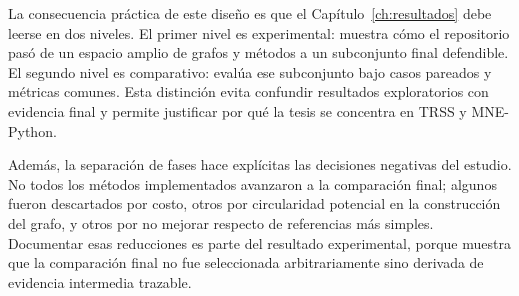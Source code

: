 La consecuencia práctica de este diseño es que el Capítulo~\ref{ch:resultados} debe leerse en dos niveles. El primer nivel es experimental: muestra cómo el repositorio pasó de un espacio amplio de grafos y métodos a un subconjunto final defendible. El segundo nivel es comparativo: evalúa ese subconjunto bajo casos pareados y métricas comunes. Esta distinción evita confundir resultados exploratorios con evidencia final y permite justificar por qué la tesis se concentra en TRSS y MNE-Python.

Además, la separación de fases hace explícitas las decisiones negativas del estudio. No todos los métodos implementados avanzaron a la comparación final; algunos fueron descartados por costo, otros por circularidad potencial en la construcción del grafo, y otros por no mejorar respecto de referencias más simples. Documentar esas reducciones es parte del resultado experimental, porque muestra que la comparación final no fue seleccionada arbitrariamente sino derivada de evidencia intermedia trazable.